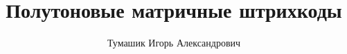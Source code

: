 \documentclass[12pt,a4paper]{article}
\author{Тумашик Игорь Александрович}
\title{Полутоновые матричные штрихкоды}
\begin{document}
\renewcommand{\figurename}{Рисунок}
\renewcommand{\appendixname}{ПРИЛОЖЕНИЕ}






\begin{appendices}
    
\end{appendices}
\end{document}
